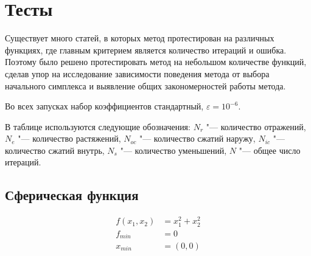 \documentclass[12pt]{article}
\theoremstyle{plain}
\theoremstyle{remark}
\theoremstyle{definition}
\begin{document}
\section{Тесты}
Существует много статей, в которых метод протестирован на различных функциях, где главным критерием является количество итераций и ошибка. Поэтому было решено протестировать метод на небольшом количестве функций, сделав упор на исследование зависимости поведения метода от выбора начального симплекса и выявление общих закономерностей работы метода.

Во всех запусках набор коэффициентов стандартный, $\varepsilon = 10^{-6}$.

В таблице используются следующие обозначения: $N_r$ "--- количество отражений, $N_e$ "--- количество растяжений, $N_{oc}$ "--- количество сжатий наружу, $N_{ic}$ "--- количество сжатий внутрь, $N_s$ "--- количество уменьшений,  $N$ "--- общее число итераций. 

\subsection{Сферическая функция}
\vspace{-0.6cm}
\begin{align*}
f(x_1, x_2) &= x_1^2 + x_2^2\\
f_{min} &= 0  \\
x_{min} &= (0, 0)
\end{align*}
\end{document}
